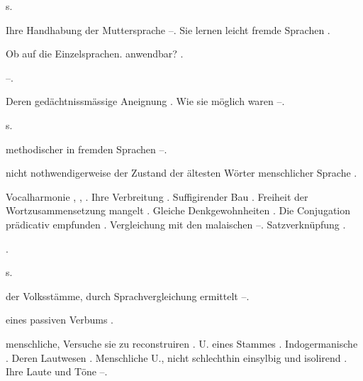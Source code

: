 \begin{register}
 s. 

 Ihre Handhabung der Muttersprache \pageref{sp.45}–\pageref{sp.46}. Sie lernen leicht fremde Sprachen \pageref{sp.67}.



 Ob auf die Einzelsprachen. anwendbar? \pageref{sp.58}.

 \pageref{sp.126}–\pageref{sp.127}.

 Deren gedächtnissmässige Aneignung \pageref{sp.64}. Wie sie möglich waren \pageref{sp.211}–\pageref{sp.212}. 

 s. 

 methodischer in fremden Sprachen \pageref{sp.71}–\pageref{sp.75}.

 nicht nothwendigerweise der Zustand der ältesten Wörter menschlicher Sprache \pageref{sp.255}.


 Vocalharmonie \pageref{sp.132}, \pageref{sp.199},  \sed{\pageref{sp.402}}. Ihre Verbreitung \pageref{sp.142}. Suffigirender Bau \pageref{sp.149}. Freiheit der Wortzusammensetzung mangelt \pageref{sp.236}. Gleiche Denkgewohnheiten \pageref{sp.293}.  Die Conjugation prädicativ empfunden \pageref{sp.391}.  Vergleichung mit den malaischen \pageref{sp.415}–\pageref{sp.420}. Satzverknüpfung \pageref{sp.465}.

 \pageref{sp.141}.


 s. 

 der Volksstämme, durch Sprachvergleichung ermittelt \pageref{sp.293}–\pageref{sp.294}.

 eines passiven Verbums \pageref{sp.102}.

 menschliche, Versuche sie zu reconstruiren \pageref{sp.67}. U. eines Stammes \pageref{sp.141}. Indogermanische \pageref{sp.184}. Deren Lautwesen \pageref{sp.186}.  Menschliche U., nicht schlechthin einsylbig und isolirend \pageref{sp.255}\sed{, \pageref{sp.314}}. Ihre Laute und Töne \pageref{sp.313}–\pageref{sp.315}.


\end{register}
